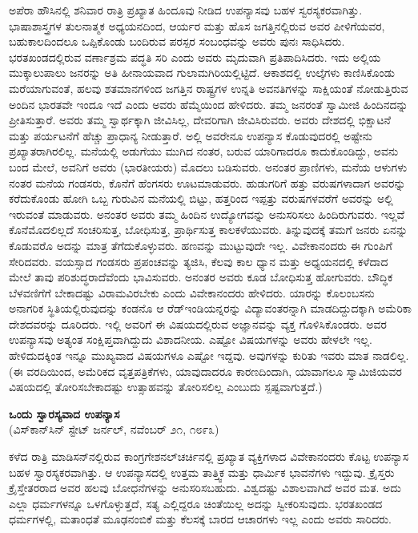 ಅಪೆರಾ ಹೌಸಿನಲ್ಲಿ ಶನಿವಾರ ರಾತ್ರಿ ಪ್ರಖ್ಯಾತ ಹಿಂದೂವು ನೀಡಿದ ಉಪನ್ಯಾಸವು ಬಹಳ ಸ್ವರಸ್ಯಕರವಾಗಿತ್ತು. ಭಾಷಾಶಾಸ್ತ್ರಗಳ ತುಲನಾತ್ಮಕ ಅಧ್ಯಯನದಿಂದ, ಆರ್ಯರ ಮತ್ತು ಹೊಸ ಜಗತ್ತಿನಲ್ಲಿರುವ ಅವರ ಪೀಳಿಗೆಯವರ, ಬಹುಕಾಲದಿಂದಲೂ ಒಪ್ಪಿಕೊಂಡು ಬಂದಿರುವ ಪರಸ್ಪರ ಸಂಬಂಧವನ್ನು ಅವರು ಪುನಃ ಸಾಧಿಸಿದರು. ಭರತಖಂಡದಲ್ಲಿರುವ ವರ್ಣಾಶ್ರಮ ಪದ್ಧತಿ ಸರಿ ಎಂದು ಅವರು ಮೃದುವಾಗಿ ಪ್ರತಿಪಾದಿಸಿದರು. ಇದು ಅಲ್ಲಿಯ ಮುಕ್ಕಾಲುಪಾಲು ಜನರನ್ನು ಅತಿ ಹೀನಾಯವಾದ ಗುಲಾಮಗಿರಿಯಲ್ಲಿಟ್ಟಿದೆ. ಆಕಾಶದಲ್ಲಿ ಉಲ್ಕೆಗಳು ಕಾಣಿಸಿಕೊಂಡು ಮರೆಯಾಗುವಂತೆ, ಹಲವು ಶತಮಾನಗಳಿಂದ ಜಗತ್ತಿನ ರಾಷ್ಟ್ರಗಳ ಉನ್ನತಿ ಅವನತಿಗಳನ್ನು ಸಾಕ್ಷಿಯಂತೆ ನೋಡುತ್ತಿರುವ ಅಂದಿನ ಭಾರತವೇ ಇಂದೂ ಇದೆ ಎಂದು ಅವರು ಹೆಮ್ಮೆಯಿಂದ ಹೇಳಿದರು. ತಮ್ಮ ಜನರಂತೆ ಸ್ವಾಮೀಜಿ ಹಿಂದಿನದನ್ನು ಪ್ರೀತಿಸುತ್ತಾರೆ. ಅವರು ತಮ್ಮ ಸ್ವಾರ್ಥಕ್ಕಾಗಿ ಜೀವಿಸಿಲ್ಲ, ದೇವರಿಗಾಗಿ ಜೀವಿಸಿರುವರು. ಅವರು ದೇಶದಲ್ಲಿ ಭಿಕ್ಷಾಟನೆ ಮತ್ತು ಪರ್ಯಟನೆಗೆ ಹೆಚ್ಚು ಪ್ರಾಧಾನ್ಯ ನೀಡುತ್ತಾರೆ. ಅಲ್ಲಿ ಅವರೇನೂ ಉಪನ್ಯಾಸ ಕೊಡುವುದರಲ್ಲಿ ಅಷ್ಟೇನು ಪ್ರಖ್ಯಾತರಾಗಿರಲಿಲ್ಲ. ಮನೆಯಲ್ಲಿ ಅಡುಗೆಯು ಮುಗಿದ ನಂತರ, ಬರುವ ಯಾರಿಗಾದರೂ ಕಾದುಕೊಂಡಿದ್ದು, ಅವನು ಬಂದ ಮೇಲೆ, ಅವನಿಗೆ ಅವರು (ಭಾರತೀಯರು) ಮೊದಲು ಬಡಿಸುವರು. ಅನಂತರ ಪ್ರಾಣಿಗಳು, ಮನೆಯ ಆಳುಗಳು ನಂತರ ಮನೆಯ ಗಂಡಸರು, ಕೊನೆಗೆ ಹೆಂಗಸರು ಊಟಮಾಡುವರು. ಹುಡುಗರಿಗೆ ಹತ್ತು ವರುಷಗಳಾದಾಗ ಅವರನ್ನು ಕರೆದುಕೊಂಡು ಹೋಗಿ ಒಬ್ಬ ಗುರುವಿನ ಮನೆಯಲ್ಲಿ ಬಿಟ್ಟು, ಹತ್ತರಿಂದ ಇಪ್ಪತ್ತು ವರುಷಗಳವರೆಗೆ ಅವರನ್ನು ಅಲ್ಲಿ ಇರುವಂತೆ ಮಾಡುವರು. ಅನಂತರ ಅವರು ತಮ್ಮ ಹಿಂದಿನ ಉದ್ಯೋಗವನ್ನು ಅನುಸರಿಸಲು ಹಿಂದಿರುಗುವರು. ಇಲ್ಲವೆ ಕೊನೆಮೊದಲಿಲ್ಲದೆ ಸಂಚರಿ\break ಸುತ್ತ, ಬೋಧಿಸುತ್ತ, ಪ್ರಾರ್ಥಿಸುತ್ತ ಕಾಲಕಳೆಯುವರು. ತಿನ್ನುವುದಕ್ಕೆ ತಮಗೆ ಜನರು ಏನನ್ನು ಕೊಡುವರೊ ಅದನ್ನು ಮಾತ್ರ ತೆಗೆದುಕೊಳ್ಳುವರು. ಹಣವನ್ನು ಮುಟ್ಟುವುದೇ ಇಲ್ಲ. ವಿವೇಕಾನಂದರು ಈ ಗುಂಪಿಗೆ ಸೇರಿದವರು. ವಯಸ್ಸಾದ ಗಂಡಸರು ಪ್ರಪಂಚವನ್ನು ತ್ಯಜಿಸಿ, ಕೆಲವು ಕಾಲ ಧ್ಯಾನ ಮತ್ತು ಅಧ್ಯಯನದಲ್ಲಿ ಕಳೆದಾದ ಮೇಲೆ ತಾವು ಪರಿಶುದ್ಧರಾದೆ\break ವೆಂದು ಭಾವಿಸುವರು. ಅನಂತರ ಅವರು ಕೂಡ ಬೋಧಿಸುತ್ತ ಹೋಗುವರು. ಬೌದ್ಧಿಕ ಬೆಳವಣಿಗೆಗೆ ಬೇಕಾದಷ್ಟು ವಿರಾಮವಿರಬೇಕು ಎಂದು ವಿವೇಕಾನಂದರು ಹೇಳಿದರು. ಯಾರನ್ನು ಕೊಲಂಬಸನು ಅನಾಗರಿಕ ಸ್ಥಿತಿಯಲ್ಲಿರುವುದನ್ನು ಕಂಡನೊ ಆ ರೆಡ್​ ಇಂಡಿಯನ್ನ\break ರನ್ನು ವಿದ್ಯಾವಂತರನ್ನಾಗಿ ಮಾಡದಿದ್ದುದಕ್ಕಾಗಿ ಅಮೆರಿಕಾ ದೇಶದವರನ್ನು ದೂರಿದರು. ಇಲ್ಲಿ ಅವರಿಗೆ ಈ ವಿಷಯದಲ್ಲಿರುವ ಅಜ್ಞಾನವನ್ನು ವ್ಯಕ್ತ ಗೊಳಿಸಿಕೊಂಡರು. ಅವರ ಉಪನ್ಯಾಸವು ಅತ್ಯಂತ ಸಂಕ್ಷಿಪ್ತವಾಗಿದ್ದುದು ವಿಶಾದನೀಯ. ಎಷ್ಟೋ ವಿಷಯಗಳನ್ನು ಅವರು ಹೇಳಲೇ ಇಲ್ಲ. ಹೇಳಿದುದಕ್ಕಿಂತ ಇನ್ನೂ ಮುಖ್ಯವಾದ ವಿಷಯಗಳೂ ಎಷ್ಟೋ ಇದ್ದವು. ಅವುಗಳನ್ನು ಕುರಿತು ಇವರು ಮಾತ ನಾಡಲಿಲ್ಲ. (ಈ ವರದಿಯಿಂದ, ಅಮೆರಿಕದ ವೃತ್ತಪತ್ರಿಕೆಗಳು, ಯಾವುದಾದರೂ ಕಾರಣದಿಂದಾಗಿ, ಯಾವಾಗಲೂ ಸ್ವಾಮಿಜಿಯವರ ವಿಷಯದಲ್ಲಿ ತೋರಿಸಬೇಕಾದಷ್ಟು ಉತ್ಸಾಹವನ್ನು ತೋರಿಸಲಿಲ್ಲ ಎಂಬುದು ಸ್ಪಷ್ಟವಾಗುತ್ತದೆ.)

\newpage

\begin{center}
\textbf{ಒಂದು ಸ್ವಾರಸ್ಯವಾದ ಉಪನ್ಯಾಸ}\\ (ವಿಸ್​ಕಾನ್​ಸಿನ್​ ಸ್ಟೇಟ್​ ಜರ್ನಲ್​, ನವೆಂಬರ್​ ೨೧, ೧೮೯೩)
\end{center}

ಕಳೆದ ರಾತ್ರಿ ಮಾಡಿಸನ್​ನಲ್ಲಿರುವ ಕಾಂಗ್ರಗೇಶನಲ್​ಚರ್ಚಿನಲ್ಲಿ ಪ್ರಖ್ಯಾತ ವ್ಯಕ್ತಿಗಳಾದ ವಿವೇಕಾನಂದರು ಕೊಟ್ಟ ಉಪನ್ಯಾಸ ಬಹಳ ಸ್ವಾರಸ್ಯಕರವಾಗಿತ್ತು. ಆ ಉಪನ್ಯಾಸದಲ್ಲಿ ಉತ್ತಮ ತಾತ್ತ್ವಿಕ ಮತ್ತು ಧಾರ್ಮಿಕ ಭಾವನೆಗಳು ಇದ್ದುವು. ಕ್ರೈಸ್ತರು ಕ್ರೈಸ್ತೇತರರಾದ ಅವರ ಹಲವು ಬೋಧನೆಗಳನ್ನು ಅನುಸರಿಸಬಹುದು. ವಿಶ್ವದಷ್ಟು ವಿಶಾಲವಾಗಿದೆ ಅವರ ಮತ. ಅದು ಎಲ್ಲಾ ಧರ್ಮಗಳನ್ನೂ ಒಳಗೊಳ್ಳುತ್ತದೆ, ಸತ್ಯ ಎಲ್ಲಿದ್ದರೂ ಚಿಂತೆಯಿಲ್ಲ ಅದನ್ನು ಸ್ವೀಕರಿಸುವುದು. ಭರತಖಂಡದ ಧರ್ಮಗಳಲ್ಲಿ, ಮತಾಂಧತೆ ಮೂಢನಂಬಿಕೆ ಮತ್ತು ಕೆಲಸಕ್ಕೆ ಬಾರದ ಆಚಾರಗಳು ಇಲ್ಲ ಎಂದು ಅವರು ಸಾರಿದರು.

